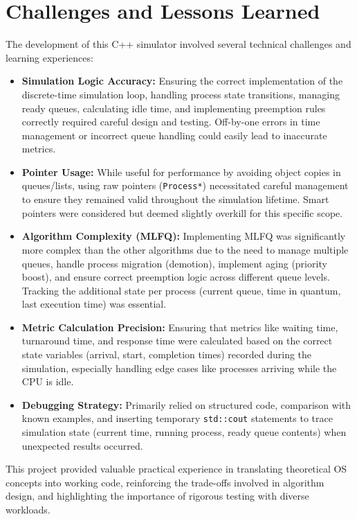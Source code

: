 \documentclass[12pt]{article}
\begin{document}
\section{Challenges and Lessons Learned}
The development of this C++ simulator involved several technical challenges and learning experiences:
\begin{itemize}
    \item \textbf{Simulation Logic Accuracy:} Ensuring the correct implementation of the discrete-time simulation loop, handling process state transitions, managing ready queues, calculating idle time, and implementing preemption rules correctly required careful design and testing. Off-by-one errors in time management or incorrect queue handling could easily lead to inaccurate metrics.
    \item \textbf{Pointer Usage:} While useful for performance by avoiding object copies in queues/lists, using raw pointers (\texttt{Process*}) necessitated careful management to ensure they remained valid throughout the simulation lifetime. Smart pointers were considered but deemed slightly overkill for this specific scope.
    \item \textbf{Algorithm Complexity (MLFQ):} Implementing MLFQ was significantly more complex than the other algorithms due to the need to manage multiple queues, handle process migration (demotion), implement aging (priority boost), and ensure correct preemption logic across different queue levels. Tracking the additional state per process (current queue, time in quantum, last execution time) was essential.
    \item \textbf{Metric Calculation Precision:} Ensuring that metrics like waiting time, turnaround time, and response time were calculated based on the correct state variables (arrival, start, completion times) recorded during the simulation, especially handling edge cases like processes arriving while the CPU is idle.
    \item \textbf{Debugging Strategy:} Primarily relied on structured code, comparison with known examples, and inserting temporary \texttt{std::cout} statements to trace simulation state (current time, running process, ready queue contents) when unexpected results occurred.
\end{itemize}
This project provided valuable practical experience in translating theoretical OS concepts into working code, reinforcing the trade-offs involved in algorithm design, and highlighting the importance of rigorous testing with diverse workloads.
\end{document}
